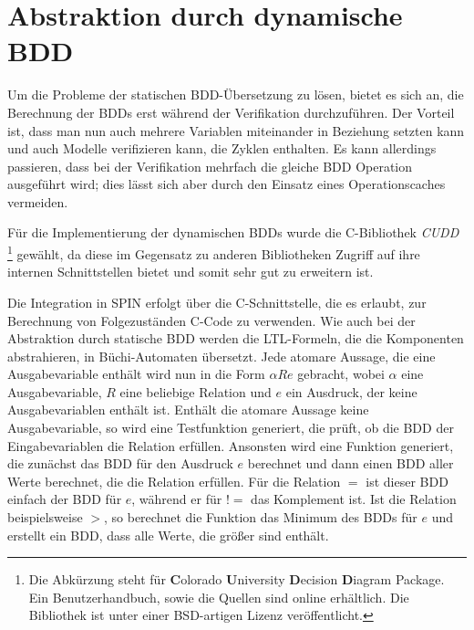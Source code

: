 \section{Abstraktion durch dynamische BDD}
Um die Probleme der statischen BDD-Übersetzung zu lösen, bietet es sich an, die Berechnung der BDDs erst während der Verifikation durchzuführen.
Der Vorteil ist, dass man nun auch mehrere Variablen miteinander in Beziehung setzten kann und auch Modelle verifizieren kann, die Zyklen enthalten.
Es kann allerdings passieren, dass bei der Verifikation mehrfach die gleiche BDD Operation ausgeführt wird; dies lässt sich aber durch den Einsatz eines Operationscaches vermeiden.

Für die Implementierung der dynamischen BDDs wurde die C-Bibliothek \emph{CUDD}
\footnote{Die Abkürzung steht für {\bf C}olorado {\bf U}niversity {\bf D}ecision {\bf D}iagram Package.
  Ein Benutzerhandbuch, sowie die Quellen sind online erhältlich\cite{cudd}.
  Die Bibliothek ist unter einer BSD-artigen Lizenz veröffentlicht.
}
gewählt, da diese im Gegensatz zu anderen Bibliotheken Zugriff auf ihre internen Schnittstellen bietet und somit sehr gut zu erweitern ist.

Die Integration in SPIN erfolgt über die C-Schnittstelle, die es erlaubt, zur Berechnung von Folgezuständen C-Code zu verwenden.
Wie auch bei der Abstraktion durch statische BDD werden die LTL-Formeln, die die Komponenten abstrahieren, in Büchi-Automaten übersetzt.
Jede atomare Aussage, die eine Ausgabevariable enthält wird nun in die Form $\alpha R e$ gebracht, wobei $\alpha$ eine Ausgabevariable, $R$ eine beliebige Relation und $e$ ein Ausdruck, der keine Ausgabevariablen enthält ist.
Enthält die atomare Aussage keine Ausgabevariable, so wird eine Testfunktion generiert, die prüft, ob die BDD der Eingabevariablen die Relation erfüllen.
Ansonsten wird eine Funktion generiert, die zunächst das BDD für den Ausdruck $e$ berechnet und dann einen BDD aller Werte berechnet, die die Relation erfüllen.
Für die Relation $=$ ist dieser BDD einfach der BDD für $e$, während er für $!=$ das Komplement ist.
Ist die Relation beispielsweise $>$, so berechnet die Funktion das Minimum des BDDs für $e$ und erstellt ein BDD, dass alle Werte, die größer sind enthält.
